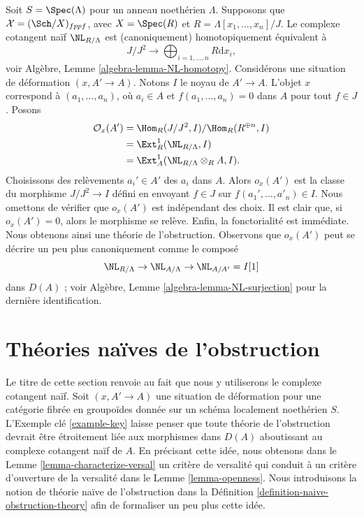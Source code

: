 \begin{example}
\label{example-key}
Soit $S = \Spec(\Lambda)$ pour un anneau noethérien $\Lambda$.
Supposons que $\mathcal{X} = (\Sch/X)_{fppf}$, avec $X = \Spec(R)$ et
$R = \Lambda[x_1, \ldots, x_n]/J$. Le complexe cotangent
naïf $\NL_{R/\Lambda}$ est (canoniquement) homotopiquement équivalent à
$$
J/J^2
\longrightarrow
\bigoplus\nolimits_{i = 1, \ldots, n} R\text{d}x_i,
$$
voir Algèbre, Lemme \ref{algebra-lemma-NL-homotopy}.
Considérons une situation de déformation $(x, A' \to A)$. Notons $I$ le noyau de
$A' \to A$. L'objet $x$ correspond à $(a_1, \ldots, a_n)$,
où $a_i \in A$ et $f(a_1, \ldots, a_n) = 0$ dans $A$ pour tout $f \in J$.
Posons
\begin{align*}
\mathcal{O}_x(A')
& =
\Hom_R(J/J^2, I)/\Hom_R(R^{\oplus n}, I) \\
& =
\Ext^1_R(\NL_{R/\Lambda}, I) \\
& =
\Ext^1_A(\NL_{R/\Lambda} \otimes_R A, I).
\end{align*}
Choisissons des relèvements $a_i' \in A'$ des $a_i$ dans $A$. Alors $o_x(A')$
est la classe du morphisme $J/J^2 \to I$ défini en envoyant $f \in J$ sur
$f(a_1', \ldots, a'_n) \in I$. Nous omettons de vérifier que
$o_x(A')$ est indépendant des choix. Il est clair que, si $o_x(A') = 0$,
alors le morphisme se relève. Enfin, la fonctorialité est immédiate.
Nous obtenons ainsi une théorie de l'obstruction. Observons que $o_x(A')$
peut se décrire un peu plus canoniquement comme le composé
$$
\NL_{R/\Lambda} \to \NL_{A/\Lambda} \to \NL_{A/A'} = I[1]
$$
dans $D(A)$ ; voir Algèbre, Lemme \ref{algebra-lemma-NL-surjection}
pour la dernière identification.
\end{example}









\section{Théories naïves de l'obstruction}
\label{section-naive-obstruction-theory}

\noindent
Le titre de cette section renvoie au fait que nous y utiliserons le
complexe cotangent naïf. Soit $(x, A' \to A)$
une situation de déformation pour une catégorie fibrée en groupoïdes donnée sur un
schéma localement noethérien $S$. L'Exemple clé \ref{example-key}
laisse penser que toute théorie de l'obstruction devrait être étroitement liée aux
morphismes dans $D(A)$ aboutissant au complexe cotangent naïf de $A$.
En précisant cette idée, nous obtenons dans le
Lemme \ref{lemma-characterize-versal} un critère de versalité qui conduit à un critère
d'ouverture de la versalité dans le Lemme \ref{lemma-openness}. Nous introduisons la notion de
théorie naïve de l'obstruction dans la
Définition \ref{definition-naive-obstruction-theory} afin de formaliser
un peu plus cette idée.

